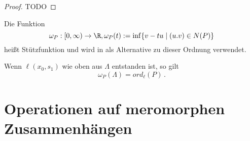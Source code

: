 \begin{proof}
TODO
\end{proof}
\begin{comment}
Ich will die Linearform vermeiden und direkt die skalare Steigung verwenden
\end{comment}
\begin{defn}[Stützfunktion]
Die Funktion
\[
\omega_P:[0,\infty)\rightarrow\R, \omega_P(t):=\inf\{v-tu \mid (u.v) \in N(P)\}
\]
heißt Stützfunktion und wird in \cite{ZulaBarbara} als Alternative zu dieser
Ordnung verwendet.
\end{defn}
\begin{bem}
Wenn $\ell(x_0,s_1)$ wie oben aus $\Lambda$ entstanden ist, so gilt
\[
\omega_P(\Lambda)=ord_\ell(P) \,.
\]
\end{bem}
\begin{comment}
TODO: ist $\ell$ Slope (gehört zu Slope) dann hat $\sigma_\ell(P)$ zumindest 2
Monome
\end{comment}

\section{Operationen auf meromorphen Zusammenhängen}
